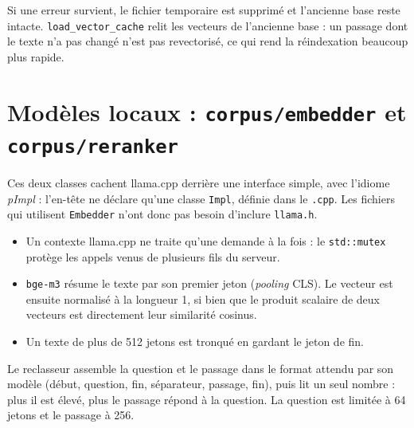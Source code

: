 \documentclass[11pt,a4paper]{article}
\newcommand{\fichier}[1]{\texttt{#1}}
\begin{document}


Si une erreur survient, le fichier temporaire est supprimé et l'ancienne base reste intacte. \texttt{load\_vector\_cache} relit les vecteurs de l'ancienne base : un passage dont le texte n'a pas changé n'est pas revectorisé, ce qui rend la réindexation beaucoup plus rapide.

\section{Modèles locaux : \texttt{corpus/embedder} et \texttt{corpus/reranker}}

Ces deux classes cachent llama.cpp derrière une interface simple, avec l'idiome \emph{pImpl} : l'en-tête ne déclare qu'une classe \texttt{Impl}, définie dans le \texttt{.cpp}. Les fichiers qui utilisent \texttt{Embedder} n'ont donc pas besoin d'inclure \texttt{llama.h}.



\begin{itemize}
  \item Un contexte llama.cpp ne traite qu'une demande à la fois : le \texttt{std::mutex} protège les appels venus de plusieurs fils du serveur.
  \item \texttt{bge-m3} résume le texte par son premier jeton (\emph{pooling} CLS). Le vecteur est ensuite normalisé à la longueur 1, si bien que le produit scalaire de deux vecteurs est directement leur similarité cosinus.
  \item Un texte de plus de 512 jetons est tronqué en gardant le jeton de fin.
\end{itemize}

Le reclasseur assemble la question et le passage dans le format attendu par son modèle (début, question, fin, séparateur, passage, fin), puis lit un seul nombre : plus il est élevé, plus le passage répond à la question. La question est limitée à 64 jetons et le passage à 256.


\end{document}

